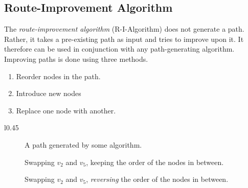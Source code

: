 \subsection{Route-Improvement Algorithm}
\label{subsec:03:rialgo}

The \emph{route-improvement algorithm} (R-I-Algorithm) does not generate a path.
Rather, it takes a pre-existing path as input and tries to improve upon it.
It therefore can be used in conjunction with any path-generating algorithm.
Improving paths is done using three methods.

\begin{enumerate}
	\itemsep0em
	\item Reorder nodes in the path.
	\item Introduce new nodes
	\item Replace one node with another.
\end{enumerate}

\begin{wrapfigure}{l}{0.45\textwidth}
	\centering
	\begin{subfigure}{0.45\textwidth}
		\centering
		\caption{A path generated by some algorithm.}
		\label{fig:03:rialgoreorderpath}
	\end{subfigure}
	\begin{subfigure}{0.45\textwidth}
		\centering
		\caption{Swapping $v_2$ and $v_5$, keeping the order of the nodes in between.}
		\label{fig:03:rialgoreorderkeep}
	\end{subfigure}
	\begin{subfigure}{0.45\textwidth}
		\centering
		\caption{Swapping $v_2$ and $v_5$, \emph{reversing} the order of the nodes in between.}
		\label{fig:03:rialgoreorderreverse}
	\end{subfigure}
	\caption{}
	\label{fig:03:rialgoreorder}
\end{wrapfigure}

